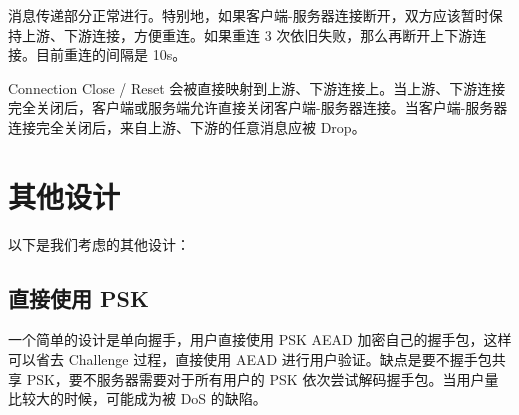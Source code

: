 \documentclass{ctexart}
\begin{document}
  消息传递部分正常进行。特别地，如果客户端-服务器连接断开，双方应该暂时保持上游、下游连接，方便重连。如果重连 3 次依旧失败，那么再断开上下游连接。目前重连的间隔是 10s。

  Connection Close / Reset 会被直接映射到上游、下游连接上。当上游、下游连接完全关闭后，客户端或服务端允许直接关闭客户端-服务器连接。当客户端-服务器连接完全关闭后，来自上游、下游的任意消息应被 Drop。

  \section{其他设计}
  以下是我们考虑的其他设计：

  \subsection{直接使用 PSK}

  一个简单的设计是单向握手，用户直接使用 PSK AEAD 加密自己的握手包，这样可以省去 Challenge 过程，直接使用 AEAD 进行用户验证。缺点是要不握手包共享 PSK，要不服务器需要对于所有用户的 PSK 依次尝试解码握手包。当用户量比较大的时候，可能成为被 DoS 的缺陷。
\end{document}
